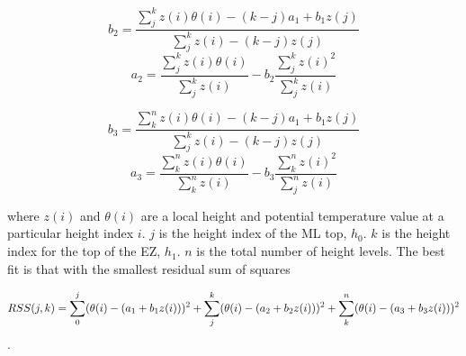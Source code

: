 \begin{equation}
b_{2} = \frac{\sum^{k}_{j}z(i) \theta(i) - (k-j) a_{1}+b_{1}z(j)}{\sum^{k}_{j}z(i) - (k-j)z(j)}
\end{equation}
\begin{equation}
a_{2} = \frac{\sum^{k}_{j}z(i)\theta(i)}{\sum^{k}_{j}z(i)} - b_{2}\frac{\sum^{k}_{j}z(i)^{2}}{\sum^{k}_{j}z(i)}
\end{equation}

\begin{equation}
b_{3} = \frac{\sum^{n}_{k}z(i) \theta(i) - (k-j) a_{1}+b_{1}z(j)}{\sum^{k}_{j}z(i) - (k-j)z(j)}
\end{equation}
\begin{equation}
a_{3} = \frac{\sum^{n}_{k}z(i)\theta(i)}{\sum^{n}_{k}z(i)} - b_{3}\frac{\sum^{n}_{k}z(i)^{2}}{\sum^{n}_{j}z(i)}
\end{equation}

where $z(i)$ and $\theta(i)$ are a local height and potential temperature value at a particular height index $i$.  $j$ is the height index of the ML top, $h_{0}$. $k$ is the height index for the top of the EZ, $h_{1}$. $n$ is the total number of height levels.  The best fit is that with the smallest residual sum of squares   

\begin{equation}
RSS(j,k) = \sum^{j}_{0}(\theta(i) - (a_{1} + b_{1}z(i)))^{2} + \sum^{k}_{j}(\theta(i) - (a_{2} + b_{2}z(i)))^{2} + \sum^{n}_{k}(\theta(i) \\
- (a_{3} + b_{3}z(i)))^{2}
\end{equation}.







